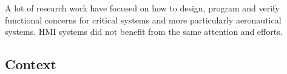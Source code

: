 





A lot  of research  work have  focused on how  to design,  program and
verify functional concerns for  critical systems and more particularly
aeronautical  systems.  HMI   systems  did   not   benefit  from   the
same  attention   and efforts. 

\subsection{Context}

